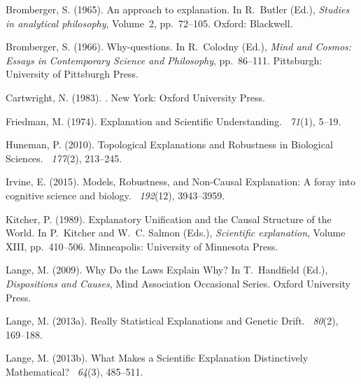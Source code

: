 \documentclass[natbib]{svjour3}                     %
\begin{document}
\begin{thebibliography}{19}
Bromberger, S. (1965).
\newblock An approach to explanation.
\newblock In R.~Butler (Ed.), {\em Studies in analytical philosophy}, Volume~2,
pp.\  72--105. Oxford: Blackwell.

Bromberger, S. (1966).
\newblock Why-questions.
\newblock In R.~Colodny (Ed.), {\em Mind and Cosmos: Essays in Contemporary
	Science and Philosophy}, pp.\  86--111. Pittsburgh: University of Pittsburgh
Press.

Cartwright, N. (1983).
.
\newblock New York: Oxford University Press.

Friedman, M. (1974).
\newblock Explanation and Scientific Understanding.
~{\em 71\/}(1), 5--19.

Huneman, P. (2010).
\newblock Topological Explanations and Robustness in Biological Sciences.
~{\em 177\/}(2), 213--245.

Irvine, E. (2015).
\newblock Models, Robustness, and Non-Causal Explanation: A foray into
cognitive science and biology.
~{\em 192\/}(12), 3943--3959.

Kitcher, P. (1989).
\newblock Explanatory Unification and the Causal Structure of the World.
\newblock In P.~Kitcher and W.~C. Salmon (Eds.), {\em Scientific explanation},
Volume XIII, pp.\  410--506. Minneapolis: University of Minnesota Press.

Lange, M. (2009).
\newblock Why Do the Laws Explain Why?
\newblock In T.~Handfield (Ed.), {\em Dispositions and Causes}, Mind
Association Occasional Series. Oxford University Press.

Lange, M. (2013a).
\newblock Really Statistical Explanations and Genetic Drift.
~{\em 80\/}(2), 169--188.

Lange, M. (2013b).
\newblock What Makes a Scientific Explanation Distinctively Mathematical?
~{\em 64\/}(3),
485--511.


\end{thebibliography}
\end{document}
